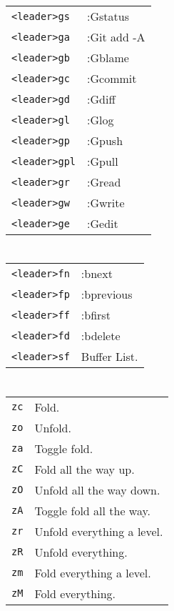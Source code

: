 \begin{multicols}{3}
	\section{}
	\begin{tabular}{@{}ll@{}}
		\verb!<leader>gs!  & :Gstatus    \\
		\verb!<leader>ga!  & :Git add -A \\
		\verb!<leader>gb!  & :Gblame     \\
		\verb!<leader>gc!  & :Gcommit    \\
		\verb!<leader>gd!  & :Gdiff      \\
		\verb!<leader>gl!  & :Glog       \\
		\verb!<leader>gp!  & :Gpush      \\
		\verb!<leader>gpl! & :Gpull      \\
		\verb!<leader>gr!  & :Gread      \\
		\verb!<leader>gw!  & :Gwrite     \\
		\verb!<leader>ge!  & :Gedit      \\
	\end{tabular}

	\section{}
	\begin{tabular}{@{}ll@{}}
		\verb!<leader>fn! & :bnext       \\
		\verb!<leader>fp! & :bprevious   \\
		\verb!<leader>ff! & :bfirst      \\
		\verb!<leader>fd! & :bdelete     \\
		\verb!<leader>sf! & Buffer List. \\
	\end{tabular}

	\section{}
	\begin{tabular}{@{}ll@{}}
		\verb!zc! & Fold.                      \\
		\verb!zo! & Unfold.                    \\
		\verb!za! & Toggle fold.               \\
		\verb!zC! & Fold all the way up.       \\
		\verb!zO! & Unfold all the way down.   \\
		\verb!zA! & Toggle fold all the way.   \\
		\verb!zr! & Unfold everything a level. \\
		\verb!zR! & Unfold everything.         \\
		\verb!zm! & Fold everything a level.   \\
		\verb!zM! & Fold everything.           \\
	\end{tabular}


\end{multicols}
